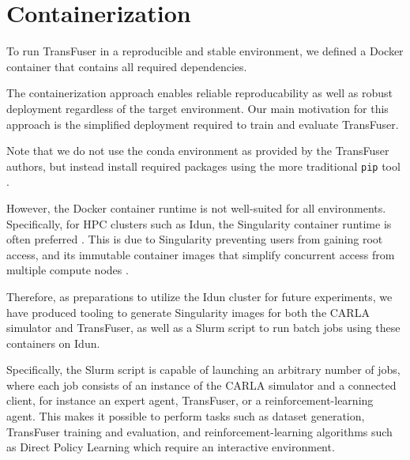 \newpage
\section{Containerization}
\label{sec:containerization}

To run TransFuser in a reproducible and stable environment,
we defined a Docker container \cite{software:docker}
that contains all required dependencies.

The containerization approach enables reliable reproducability
as well as robust deployment regardless of the target environment.
Our main motivation for this approach is the simplified deployment
required to train and evaluate TransFuser.

Note that we do not use the conda \cite{software:conda} environment
as provided by the TransFuser authors,
but instead install required packages
using the more traditional \texttt{pip} tool \cite{software:pip}.

However, the Docker container runtime is not well-suited for all environments.
Specifically, for HPC clusters such as Idun,
the Singularity container runtime \cite{software:singularity} is often preferred \cite{princeton:singularity}.
This is due to Singularity preventing users from gaining root access, 
and its immutable container images that simplify concurrent access from multiple compute nodes .

Therefore, as preparations to utilize the Idun cluster for future experiments,
we have produced tooling to generate Singularity images for both the CARLA simulator and TransFuser,
as well as a Slurm script to run batch jobs using these containers on Idun.

Specifically, the Slurm script is capable of launching an arbitrary number of jobs,
where each job consists of an instance of the CARLA simulator and a connected client, for instance an expert agent, TransFuser, or a reinforcement-learning agent.
This makes it possible to perform tasks such as
dataset generation,
TransFuser training and evaluation,
and reinforcement-learning algorithms such as Direct Policy Learning which require an interactive environment.
